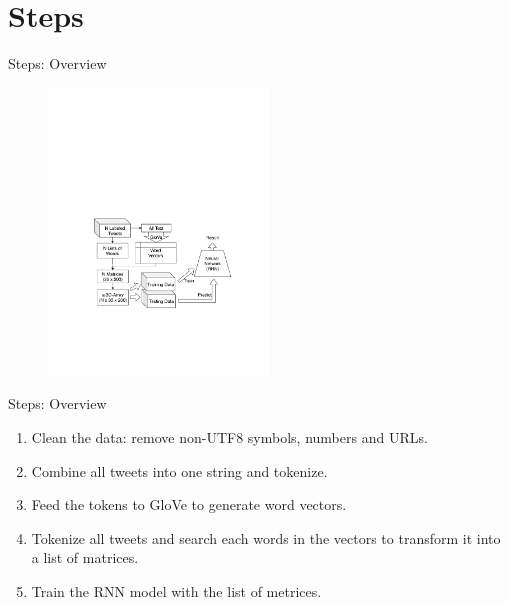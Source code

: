 \documentclass{beamer}
\begin{document}
\section{Steps}%
\label{sec:steps}

\begin{frame}{Steps: Overview}
    \begin{figure}[h]
        \includegraphics[trim={2cm 5cm 0 12cm},clip,height=3in]{img/flow_chart.pdf}
        \label{fig:}
    \end{figure}
\end{frame}

\begin{frame}{Steps: Overview}
	\begin{enumerate}
		\item Clean the data: remove non-UTF8 symbols, numbers and URLs.
		\item Combine all tweets into one string and tokenize.
		\item Feed the tokens to GloVe to generate word vectors.
		\item Tokenize all tweets and search each words in the vectors to transform it into a list of matrices.
		\item Train the RNN model with the list of metrices.
	\end{enumerate}	
\end{frame}
\end{document}

